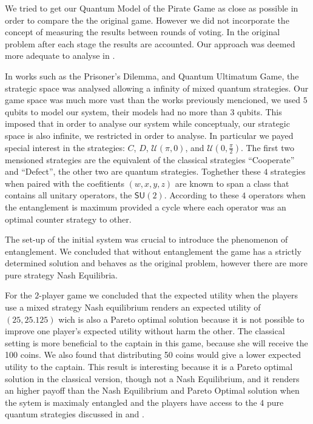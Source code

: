 \documentclass[10pt,twocolumn]{llncs}
\begin{document}
We tried to get our Quantum Model of the Pirate Game as close as possible in order to compare the the original game. However we did not incorporate the concept of measuring the results between rounds of voting. In the original problem after each stage the results are accounted. Our approach was deemed more adequate to analyse in \cite{Fra2011}.

In works such as the Prisoner's Dilemma\cite{Letters2002}\cite{Eisert2008}, and Quantum Ultimatum Game\cite{Fra2011}, the strategic space was analysed allowing a infinity of mixed quantum strategies. Our game space was much more vast than the works previously mencioned, we used $5$ qubits to model our system, their models had no more than $3$ qubits. This imposed that in order to analyse our system while conceptualy, our strategic space is also infinite, we restricted in order to analyse. In particular we payed special interest in the strategies: $C$, $D$, $\mathcal{U}(\pi, 0)$, and $\mathcal{U}(0, \frac{\pi}{2})$. The first two mensioned strategies are the equivalent of the classical strategies ``Cooperate'' and ``Defect'', the other two are quantum strategies. Toghether these $4$ strategies when paired with the coefitients $(w,x,y,z)$ are known to span a class that contains all unitary operators, the $\mathsf{SU}(2)$. According to \cite{Du} these $4$ operators when the entanglement is maximum provided a cycle where each operator was an optimal counter strategy to other. 

The set-up of the initial system was crucial to introduce the phenomenon of entanglement. We concluded that without entanglement the game has a strictly determined solution and behaves as the original problem, however there are more pure strategy Nash Equilibria.

For the $2$-player game we concluded that the expected utility when the players use a mixed strategy Nash equilibrium renders an expected utility of $(25, 25.125)$ wich is also a Pareto optimal solution because it is not possible to improve one player's expected utility without harm the other. The classical setting is more beneficial to the captain in this game, because she will receive the 100 coins. We also found that distributing 50 coins would give a lower expected utility to the captain. This result is interesting because it is a Pareto optimal solution in the classical version, though not a Nash Equilibrium, and it renders an higher payoff than the Nash Equilibrium and Pareto Optimal solution when the sytem is maximaly entangled and the players have access to the $4$ pure quantum strategies discussed in \cite{Du} and \cite{Letters2002}. 
\end{document}
